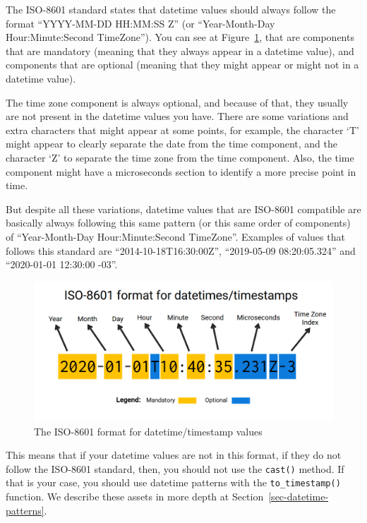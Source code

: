 \documentclass[
  11pt,
  letterpaper,
  DIV=11,
  numbers=noendperiod]{scrreprt}
\begin{document}
The ISO-8601 standard states that datetime values should always follow
the format ``YYYY-MM-DD HH:MM:SS Z'' (or ``Year-Month-Day
Hour:Minute:Second TimeZone''). You can see at
Figure~\ref{fig-iso-8601-datetime}, that are components that are
mandatory (meaning that they always appear in a datetime value), and
components that are optional (meaning that they might appear or might
not in a datetime value).

The time zone component is always optional, and because of that, they
usually are not present in the datetime values you have. There are some
variations and extra characters that might appear at some points, for
example, the character `T' might appear to clearly separate the date
from the time component, and the character `Z' to separate the time zone
from the time component. Also, the time component might have a
microseconds section to identify a more precise point in time.

But despite all these variations, datetime values that are ISO-8601
compatible are basically always following this same pattern (or this
same order of components) of ``Year-Month-Day Hour:Minute:Second
TimeZone''. Examples of values that follows this standard are
``2014-10-18T16:30:00Z'', ``2019-05-09 08:20:05.324'' and ``2020-01-01
12:30:00 -03''.

\begin{figure}

{\centering \includegraphics[width=1\textwidth,height=\textheight]{Chapters/./../Figures/format_datetime.png}

}

\caption{\label{fig-iso-8601-datetime}The ISO-8601 format for
datetime/timestamp values}

\end{figure}

This means that if your datetime values are not in this format, if they
do not follow the ISO-8601 standard, then, you should not use the
\texttt{cast()} method. If that is your case, you should use datetime
patterns with the \texttt{to\_timestamp()} function. We describe these
assets in more depth at Section~\ref{sec-datetime-patterns}.
\end{document}
